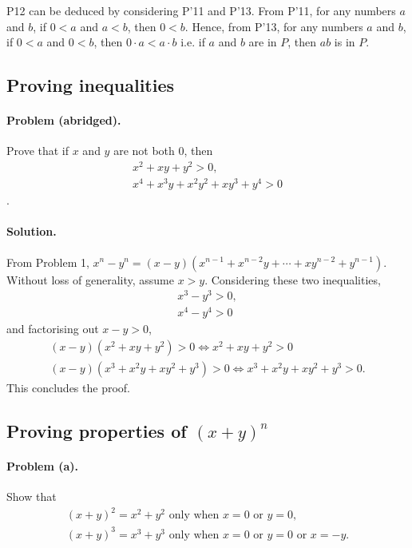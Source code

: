 \documentclass{article}
\begin{document}
P12 can be deduced by considering P'11 and P'13. From P'11, for any numbers $a$
and $b$, if $0 < a$ and $a < b$, then $0 < b$. Hence, from P'13, for any
numbers $a$ and $b$, if $0 < a$ and $0 < b$, then $0 \cdot a < a \cdot b$ i.e.
if $a$ and $b$ are in $P$, then $ab$ is in $P$.

\setcounter{subsection}{14}
\subsection{Proving inequalities}

\paragraph{Problem (abridged).} Prove that if $x$ and $y$ are not both 0, then
\begin{gather*}
  x^2 + xy + y^2 > 0, \\
  x^4 + x^3y + x^2y^2 + xy^3 + y^4 > 0
\end{gather*}.

\paragraph{Solution.} From Problem 1, $x^n - y^n = (x - y)(x^{n-1} + x^{n-2}y +
\cdots + xy^{n-2} + y^{n-1})$. Without loss of generality, assume $x > y$.
Considering these two inequalities, \begin{gather*}
  x^3 - y^3 > 0, \\
  x^4 - y^4 > 0
\end{gather*} and factorising out $x - y > 0$, \begin{gather*}
  (x - y)(x^2 + xy + y^2) > 0 \iff x^2 + xy + y^2 > 0 \\
  (x - y)(x^3 + x^2y + xy^2 + y^3) > 0 \iff x^3 + x^2y + xy^2 + y^3 > 0.
\end{gather*}
This concludes the proof.

\setcounter{subsection}{15}
\subsection{Proving properties of $(x + y )^n$}

\paragraph{Problem (a).} Show that \begin{gather*}
  (x + y)^2 = x^2 + y^2 \text{ only when } x = 0 \text{ or } y = 0, \\
  (x + y)^3 = x^3 + y^3 \text{ only when } x = 0 \text{ or } y = 0 \text{ or }
  x = -y.
\end{gather*}
\end{document}
